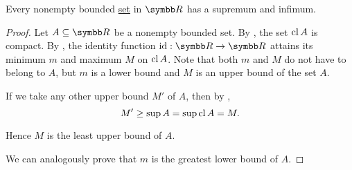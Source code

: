 \begin{proposition}\label{thm:real_bounded_set_has_supremum}
  Every nonempty bounded \hyperref[def:metric_space/bounded_set]{set} in \( \BR \) has a supremum and infimum.
\end{proposition}
\begin{proof}
  Let \( A \subseteq \BR \) be a nonempty bounded set. By , the set \( \operatorname{cl} A \) is compact. By , the identity function \( \Id: \BR \to \BR \) attains its minimum \( m \) and maximum \( M \) on \( \operatorname{cl} A \). Note that both \( m \) and \( M \) do not have to belong to \( A \), but \( m \) is a lower bound and \( M \) is an upper bound of the set \( A \).

  If we take any other upper bound \( M' \) of \( A \), then by ,
  \begin{equation*}
    M' \geq \sup A = \sup \operatorname{cl} A = M.
  \end{equation*}

  Hence \( M \) is the least upper bound of \( A \).

  We can analogously prove that \( m \) is the greatest lower bound of \( A \).
\end{proof}
